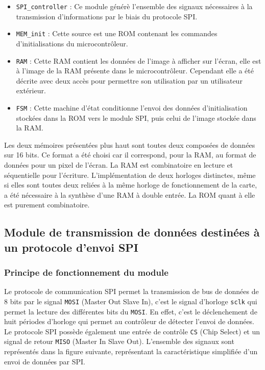 \documentclass[11pt]{article}
\begin{document}
\begin{itemize}

\item[\textbullet] \texttt{SPI\_controller} : Ce module générè l'ensemble des signaux nécessaires à la transmission d'informations par le biais du protocole SPI.

\item[\textbullet] \texttt{MEM\_init} : Cette source est une ROM contenant les commandes d'initialisations du microcontrôleur.

\item[\textbullet] \texttt{RAM} : Cette RAM contient les données de l'image à afficher sur l'écran, elle est à l'image de la RAM présente dans le microcontrôleur. Cependant elle a été décrite avec deux accès pour permettre son utilisation par un utilisateur extérieur.

\item[\textbullet] \texttt{FSM} : Cette machine d'état conditionne l'envoi des données d'initialisation stockées dans la ROM vers le module SPI, puis celui de l'image stockée dans la RAM.

\end{itemize}

Les deux mémoires présentées plus haut sont toutes deux composées de données sur 16 bits. Ce format a été choisi car il correspond, pour la RAM, au format de données pour un pixel de l'écran. La RAM est combinatoire en lecture et séquentielle pour l'écriture. L'implémentation de deux horloges distinctes, même si  elles sont toutes deux reliées à la même horloge de fonctionnement de la carte, a été nécessaire à la synthèse d'une RAM à double entrée. La ROM quant à elle est purement combinatoire.

\subsection{Module de transmission de données destinées à un protocole d'envoi SPI}

\subsubsection{Principe de fonctionnement du module}

Le protocole de communication SPI permet la transmission de bus de données de 8 bits par le signal \texttt{MOSI} (Master Out Slave In), c'est le signal d'horloge \texttt{sclk} qui permet la lecture des différentes bits du \texttt{MOSI}. En effet, c'est le déclenchement de huit périodes d'horloge qui permet au contrôleur de détecter l'envoi de données. Le protocole SPI possède également une entrée de contrôle \texttt{CS} (Chip Select) et un signal de retour \texttt{MISO} (Master In Slave Out). L'ensemble des signaux sont représentés dans la figure suivante, représentant la caractéristique simplifiée d'un envoi de données par SPI.
\end{document}
